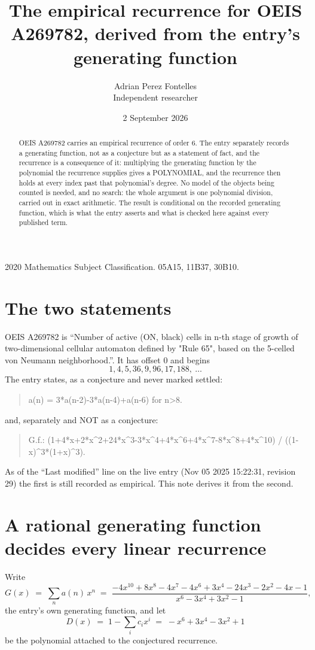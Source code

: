\documentclass[11pt,a4paper]{article}
\title{The empirical recurrence for OEIS A269782, derived from the entry's generating function}
\author{Adrian Perez Fontelles\\ \small Independent researcher}
\date{2 September 2026}
\theoremstyle{plain}
\theoremstyle{definition}
\begin{document}
\maketitle

\begin{abstract}
OEIS A269782 carries an empirical recurrence of order $6$. The entry separately records a
generating function, not as a conjecture but as a statement of fact, and the recurrence is a
consequence of it: multiplying the generating function by the polynomial the recurrence
supplies gives a POLYNOMIAL, and the recurrence then holds at every index past that
polynomial's degree. No model of the objects being counted is needed, and no search: the
whole argument is one polynomial division, carried out in exact arithmetic. The result is
conditional on the recorded generating function, which is what the entry asserts and what is
checked here against every published term.
\end{abstract}

\noindent\small 2020 Mathematics Subject Classification. 05A15, 11B37, 30B10.\normalsize

\section{The two statements}

OEIS A269782 is ``Number of active (ON, black) cells in n-th stage of growth of two-dimensional cellular automaton defined by "Rule 65", based on the 5-celled von Neumann neighborhood.''. It has offset $0$ and begins
\[
1, 4, 5, 36, 9, 96, 17, 188,\ \dots
\]
The entry states, as a conjecture and never marked settled:
\begin{quote}
a(n) = 3*a(n-2)-3*a(n-4)+a(n-6) for n>8.
\end{quote}
and, separately and NOT as a conjecture:
\begin{quote}
G.f.: (1+4*x+2*x\^{}2+24*x\^{}3-3*x\^{}4+4*x\^{}6+4*x\^{}7-8*x\^{}8+4*x\^{}10) / ((1-x)\^{}3*(1+x)\^{}3).
\end{quote}
As of the ``Last modified'' line on the live entry (Nov 05 2025 15:22:31, revision 29) the first is still
recorded as empirical. This note derives it from the second.

\section{A rational generating function decides every linear recurrence}

Write
\[
G(x)\;=\;\sum_{n}a(n)\,x^{n}\;=\;\frac{- 4 x^{10} + 8 x^{8} - 4 x^{7} - 4 x^{6} + 3 x^{4} - 24 x^{3} - 2 x^{2} - 4 x - 1}{x^{6} - 3 x^{4} + 3 x^{2} - 1},
\]
the entry's own generating function, and let
\[
D(x)\;=\;1-\sum_i c_i x^{i}\;=\;- x^{6} + 3 x^{4} - 3 x^{2} + 1
\]
be the polynomial attached to the conjectured recurrence.
\end{document}
